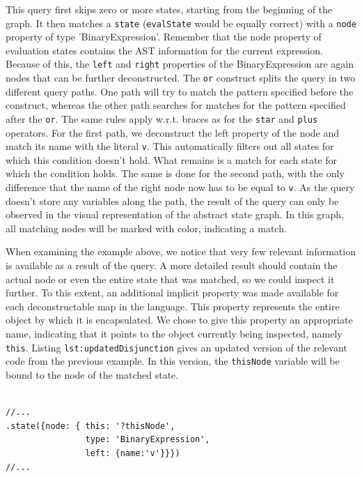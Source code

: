 This query first skips zero or more states, starting from the beginning of the graph. It then matches a \texttt{state} (\texttt{evalState} would be equally correct) with a \texttt{node} property of type 'BinaryExpression'. Remember that the node property of evaluation states contains the AST information for the current expression. Because of this, the \texttt{left} and \texttt{right} properties of the BinaryExpression are again nodes that can be further deconstructed. The \texttt{or} construct splits the query in two different query paths. One path will try to match the pattern specified before the construct, whereas the other path searches for matches for the pattern specified after the \texttt{or}. The same rules apply w.r.t. braces as for the \texttt{star} and \texttt{plus} operators. For the first path, we deconstruct the left property of the node and match its name with the literal \texttt{v}. This automatically filters out all states for which this condition doesn't hold. What remains is a match for each state for which the condition holds. The same is done for the second path, with the only difference that the name of the right node now has to be equal to \texttt{v}. As the query doesn't store any variables along the path, the result of the query can only be observed in the visual representation of the abstract state graph. In this graph, all matching nodes will be marked with color, indicating a match.

When examining the example above, we notice that very few relevant information is available as a result of the query. A more detailed result should contain the actual node or even the entire state that was matched, so we could inspect it further. To this extent, an additional implicit property was made available for each deconstructable map in the language. This property represents the entire object by which it is encapsulated. We chose to give this property an appropriate name, indicating that it points to the object currently being inspected, namely \texttt{this}. Listing \texttt{lst:updatedDisjunction} gives an updated version of the relevant code from the previous example. In this version, the \texttt{thisNode} variable will be bound to the node of the matched state.

\begin{lstlisting}[label={lst:updatedDisjunction},language=JSQL,caption=Using the \texttt{this} keyword,mathescape=true]  % float=t?

//...
.state({node: { this: '?thisNode',
                type: 'BinaryExpression',
                left: {name:'v'}}})     
//... 
\end{lstlisting}

